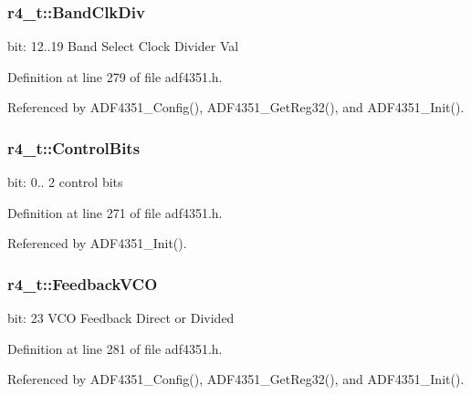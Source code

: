 \subsubsection[{\texorpdfstring{Band\+Clk\+Div}{BandClkDiv}}]{ r4\+\_\+t\+::\+Band\+Clk\+Div}\hypertarget{structr4__t_af9bbf20145437bb5913e815a71cc3eb5}{}\label{structr4__t_af9bbf20145437bb5913e815a71cc3eb5}
bit\+: 12..19 Band Select Clock Divider Val 

Definition at line 279 of file adf4351.\+h.



Referenced by A\+D\+F4351\+\_\+\+Config(), A\+D\+F4351\+\_\+\+Get\+Reg32(), and A\+D\+F4351\+\_\+\+Init().

\subsubsection[{\texorpdfstring{Control\+Bits}{ControlBits}}]{ r4\+\_\+t\+::\+Control\+Bits}\hypertarget{structr4__t_a9f03fbb2e74ac5c97c73cd70755d95eb}{}\label{structr4__t_a9f03fbb2e74ac5c97c73cd70755d95eb}
bit\+: 0.. 2 control bits 

Definition at line 271 of file adf4351.\+h.



Referenced by A\+D\+F4351\+\_\+\+Init().

\subsubsection[{\texorpdfstring{Feedback\+V\+CO}{FeedbackVCO}}]{ r4\+\_\+t\+::\+Feedback\+V\+CO}\hypertarget{structr4__t_af070024e13538726836fc1c405aa0124}{}\label{structr4__t_af070024e13538726836fc1c405aa0124}
bit\+: 23 V\+CO Feedback Direct or Divided 

Definition at line 281 of file adf4351.\+h.



Referenced by A\+D\+F4351\+\_\+\+Config(), A\+D\+F4351\+\_\+\+Get\+Reg32(), and A\+D\+F4351\+\_\+\+Init().

